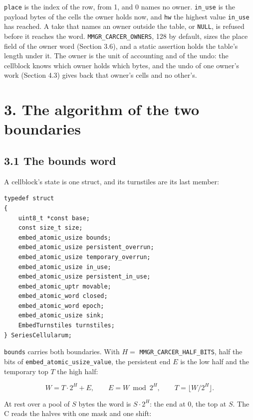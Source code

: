 \texttt{place} is the index of the row, from 1, and 0 names no owner. \texttt{in\_\allowbreak{}use} is the payload bytes of the cells the owner holds now, and \texttt{hw} the highest value \texttt{in\_\allowbreak{}use} has reached. A take that names an owner outside the table, or \texttt{NULL}, is refused before it reaches the word. \texttt{MMGR\_\allowbreak{}CARCER\_\allowbreak{}OWNERS}, 128 by default, sizes the place field of the owner word (Section 3.6), and a static assertion holds the table's length under it. The owner is the unit of accounting and of the undo: the cellblock knows which owner holds which bytes, and the undo of one owner's work (Section 4.3) gives back that owner's cells and no other's.

\section{\texorpdfstring{3. The algorithm of the two boundaries}{3. The algorithm of the two boundaries}}

\subsection{\texorpdfstring{3.1 The bounds word}{3.1 The bounds word}}

A cellblock's state is one struct, and its turnstiles are its last member:

\begin{Verbatim}
typedef struct
{
    uint8_t *const base;
    const size_t size;
    embed_atomic_usize bounds;
    embed_atomic_usize persistent_overrun;
    embed_atomic_usize temporary_overrun;
    embed_atomic_usize in_use;
    embed_atomic_usize persistent_in_use;
    embed_atomic_uptr movable;
    embed_atomic_word closed;
    embed_atomic_word epoch;
    embed_atomic_usize sink;
    EmbedTurnstiles turnstiles;
} SeriesCellularum;
\end{Verbatim}

\texttt{bounds} carries both boundaries. With \(H = \) \texttt{MMGR\_\allowbreak{}CARCER\_\allowbreak{}HALF\_\allowbreak{}BITS}, half the bits of \texttt{embed\_\allowbreak{}atomic\_\allowbreak{}usize\_\allowbreak{}value}, the persistent end \(E\) is the low half and the temporary top \(T\) the high half:

\[
W = T \cdot 2^{H} + E, \qquad E = W \bmod 2^{H}, \qquad T = \lfloor W / 2^{H} \rfloor .
\]

At rest over a pool of \(S\) bytes the word is \(S \cdot 2^H\): the end at 0, the top at \(S\). The C reads the halves with one mask and one shift:

